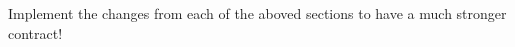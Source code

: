 \documentclass[12pt]{article}
\begin{document}
Implement the changes from each of the aboved sections to have a much stronger contract!














\end{document}
